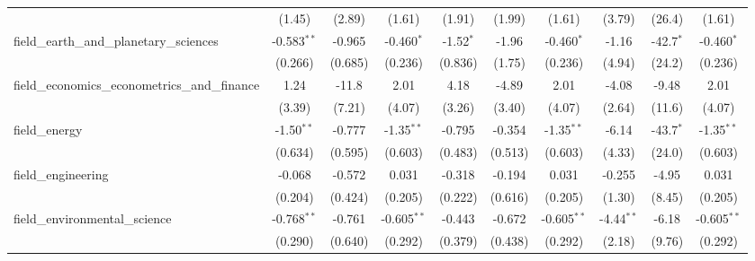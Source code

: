\begin{tabular}{lccccccccc}
                                                               & (1.45)         & (2.89)         & (1.61)         & (1.91)         & (1.99)        & (1.61)         & (3.79)         & (26.4)        & (1.61)\\   
   field\_earth\_and\_planetary\_sciences                      & -0.583$^{**}$  & -0.965         & -0.460$^{*}$   & -1.52$^{*}$    & -1.96         & -0.460$^{*}$   & -1.16          & -42.7$^{*}$   & -0.460$^{*}$\\   
                                                               & (0.266)        & (0.685)        & (0.236)        & (0.836)        & (1.75)        & (0.236)        & (4.94)         & (24.2)        & (0.236)\\   
   field\_economics\_econometrics\_and\_finance                & 1.24           & -11.8          & 2.01           & 4.18           & -4.89         & 2.01           & -4.08          & -9.48         & 2.01\\   
                                                               & (3.39)         & (7.21)         & (4.07)         & (3.26)         & (3.40)        & (4.07)         & (2.64)         & (11.6)        & (4.07)\\   
   field\_energy                                               & -1.50$^{**}$   & -0.777         & -1.35$^{**}$   & -0.795         & -0.354        & -1.35$^{**}$   & -6.14          & -43.7$^{*}$   & -1.35$^{**}$\\   
                                                               & (0.634)        & (0.595)        & (0.603)        & (0.483)        & (0.513)       & (0.603)        & (4.33)         & (24.0)        & (0.603)\\   
   field\_engineering                                          & -0.068         & -0.572         & 0.031          & -0.318         & -0.194        & 0.031          & -0.255         & -4.95         & 0.031\\   
                                                               & (0.204)        & (0.424)        & (0.205)        & (0.222)        & (0.616)       & (0.205)        & (1.30)         & (8.45)        & (0.205)\\   
   field\_environmental\_science                               & -0.768$^{**}$  & -0.761         & -0.605$^{**}$  & -0.443         & -0.672        & -0.605$^{**}$  & -4.44$^{**}$   & -6.18         & -0.605$^{**}$\\   
                                                               & (0.290)        & (0.640)        & (0.292)        & (0.379)        & (0.438)       & (0.292)        & (2.18)         & (9.76)        & (0.292)\\   

\end{tabular}
